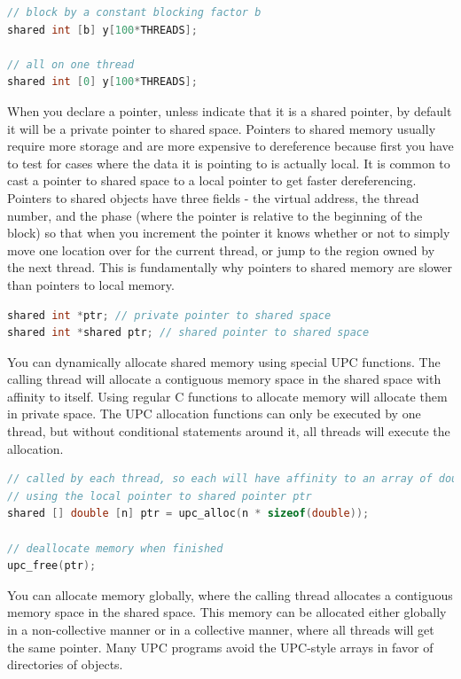\documentclass[10pt]{article}
\begin{document}
\begin{flushleft}
\begin{lstlisting}[language=C]
// block by a constant blocking factor b
shared int [b] y[100*THREADS];

// all on one thread
shared int [0] y[100*THREADS];
\end{lstlisting}

When you declare a pointer, unless indicate that it is a shared pointer, by default it will be a private pointer to shared space. Pointers to shared memory usually require more storage and are more expensive to dereference because first you have to test for cases where the data it is pointing to is actually local. It is common to cast a pointer to shared space to a local pointer to get faster dereferencing. Pointers to shared objects have three fields - the virtual address, the thread number, and the phase (where the pointer is relative to the beginning of the block) so that when you increment the pointer it knows whether or not to simply move one location over for the current thread, or jump to the region owned by the next thread. This is fundamentally why pointers to shared memory are slower than pointers to local memory. 

\begin{lstlisting}[language=C]
shared int *ptr; // private pointer to shared space
shared int *shared ptr; // shared pointer to shared space
\end{lstlisting}

You can dynamically allocate shared memory using special UPC functions. The calling thread will allocate a contiguous memory space in the shared space with affinity to itself. Using regular C functions to allocate memory will allocate them in private space. The UPC allocation functions can only be executed by one thread, but without conditional statements around it, all threads will execute the allocation. 

\begin{lstlisting}[language=C]
// called by each thread, so each will have affinity to an array of doubles
// using the local pointer to shared pointer ptr
shared [] double [n] ptr = upc_alloc(n * sizeof(double));

// deallocate memory when finished
upc_free(ptr);
\end{lstlisting}

You can allocate memory globally, where the calling thread allocates a contiguous memory space in the shared space. This memory can be allocated either globally in a non-collective manner or in a collective manner, where all threads will get the same pointer. Many UPC programs avoid the UPC-style arrays in favor of directories of objects. 


\end{flushleft}
\end{document}
